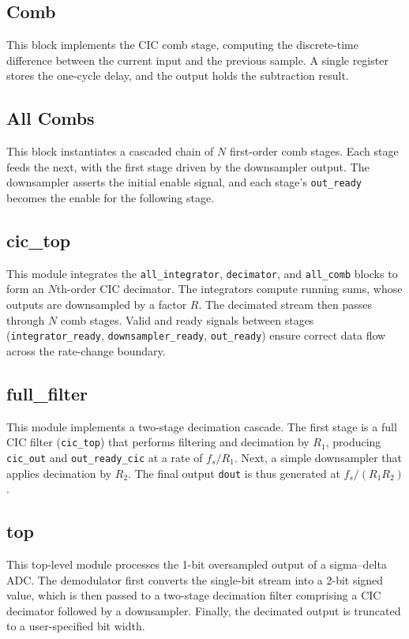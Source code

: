 \documentclass[11pt,onecolumn]{IEEEtran}
\begin{document}
\subsection{Comb}
This block implements the CIC comb stage, computing the discrete-time difference between the current input and the previous sample. A single register stores the one-cycle delay, and the output holds the subtraction result.

\subsection{All Combs}
This block instantiates a cascaded chain of $N$ first-order comb stages. Each stage feeds the next, with the first stage driven by the downsampler output. The downsampler asserts the initial enable signal, and each stage’s \texttt{out\_ready} becomes the enable for the following stage.

\subsection{cic\_top}
This module integrates the \texttt{all\_integrator}, \texttt{decimator}, and \texttt{all\_comb} blocks to form an $N$th-order CIC decimator. The integrators compute running sums, whose outputs are downsampled by a factor $R$. The decimated stream then passes through $N$ comb stages. Valid and ready signals between stages (\texttt{integrator\_ready}, \texttt{downsampler\_ready}, \texttt{out\_ready}) ensure correct data flow across the rate-change boundary.


\subsection{full\_filter}
This module implements a two-stage decimation cascade. The first stage is a full CIC filter (\texttt{cic\_top}) that performs filtering and decimation by $R_1$, producing \texttt{cic\_out} and \texttt{out\_ready\_cic} at a rate of $f_s/R_1$. Next, a simple downsampler that applies decimation by $R_2$. The final output \texttt{dout} is thus generated at $f_s/(R_1 R_2)$.


\subsection{top}
This top-level module processes the 1-bit oversampled output of a sigma--delta ADC. The demodulator first converts the single-bit stream into a 2-bit signed value, which is then passed to a two-stage decimation filter comprising a CIC decimator followed by a downsampler. Finally, the decimated output is truncated to a user-specified bit width.
\end{document}
